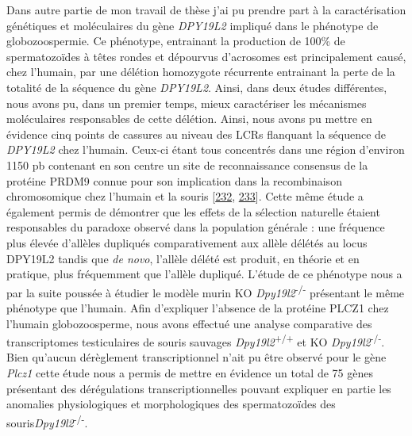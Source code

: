 \documentclass[12pt,a4paper,twoside]{ugathesis}
\theoremstyle{definition}
\theoremstyle{definition}
\theoremstyle{definition}
\theoremstyle{remark}
\begin{document}
Dans autre partie de mon travail de thèse j'ai pu prendre part à la
caractérisation génétiques et moléculaires du gène \emph{DPY19L2}
impliqué dans le phénotype de globozoospermie. Ce phénotype, entrainant
la production de 100\% de spermatozoïdes à têtes rondes et dépourvus
d'acrosomes est principalement causé, chez l'humain, par une délétion
homozygote récurrente entrainant la perte de la totalité de la séquence
du gène \emph{DPY19L2}. Ainsi, dans deux études différentes, nous avons
pu, dans un premier temps, mieux caractériser les mécanismes
moléculaires responsables de cette délétion. Ainsi, nous avons pu mettre
en évidence cinq points de cassures au niveau des LCRs flanquant la
séquence de \emph{DPY19L2} chez l'humain. Ceux-ci étant tous concentrés
dans une région d'environ 1150 pb contenant en son centre un site de
reconnaissance consensus de la protéine PRDM9 connue pour son
implication dans la recombinaison chromosomique chez l'humain et la
souris {[}\protect\hyperlink{ref-Parvanov2010}{232},
\protect\hyperlink{ref-Baudat2010}{233}{]}. Cette même étude a également
permis de démontrer que les effets de la sélection naturelle étaient
responsables du paradoxe observé dans la population générale : une
fréquence plus élevée d'allèles dupliqués comparativement aux allèle
délétés au locus DPY19L2 tandis que \emph{de novo}, l'allèle délété est
produit, en théorie et en pratique, plus fréquemment que l'allèle
dupliqué. L'étude de ce phénotype nous a par la suite poussée à étudier
le modèle murin KO \emph{Dpy19l2}\textsuperscript{-/-} présentant le
même phénotype que l'humain. Afin d'expliquer l'absence de la protéine
PLCZ1 chez l'humain globozoosperme, nous avons effectué une analyse
comparative des transcriptomes testiculaires de souris sauvages
\emph{Dpy19l2}\textsuperscript{+/+} et KO
\emph{Dpy19l2}\textsuperscript{-/-}. Bien qu'aucun dérèglement
transcriptionnel n'ait pu être observé pour le gène \emph{Plcz1} cette
étude nous a permis de mettre en évidence un total de 75 gènes
présentant des dérégulations transcriptionnelles pouvant expliquer en
partie les anomalies physiologiques et morphologiques des spermatozoïdes
des souris\emph{Dpy19l2}\textsuperscript{-/-}.
\end{document}

